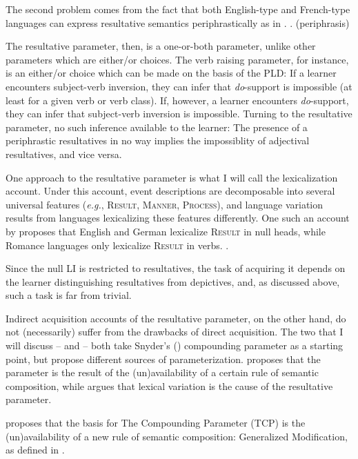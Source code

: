 \documentclass[MilwayThesis]{subfiles}
\begin{document}
The second problem comes from the fact that both English-type and French-type languages can express resultative semantics periphrastically as in \Next.
\ex. (periphrasis)

The resultative parameter, then, is a one-or-both parameter, unlike other parameters which are either/or choices.
The verb raising parameter, for instance, is an either/or choice which can be made on the basis of the PLD:
If a learner encounters subject-verb inversion, they can infer that \textit{do}-support is impossible (at least for a given verb or verb class). 
If, however, a learner encounters \textit{do}-support, they can infer that subject-verb inversion is impossible. 
Turning to the resultative parameter, no such inference available to the learner:
The presence of a periphrastic resultatives in no way implies the impossiblity of adjectival resultatives, and vice versa.

One approach to the resultative parameter is what I will call the lexicalization account.
Under this account, event descriptions are decomposable into several universal features (\textit{e.g.}, \textsc{Result}, \textsc{Manner}, \textsc{Process}), and language variation results from languages lexicalizing these features differently.
One such an account by \textcite{son2008microparameters} proposes that English and German lexicalize \textsc{Result} in null heads, while Romance languages only lexicalize \textsc{Result} in verbs.
\ex.

Since the null LI is restricted to resultatives, the task of acquiring it depends on the learner distinguishing resultatives from depictives, and, as discussed above, such a task is far from trivial.

Indirect acquisition accounts of the resultative parameter, on the other hand, do not (necessarily) suffer from the drawbacks of direct acquisition.
The two that I will discuss -- \textcite{snyder2012parameter} and \textcite{kratzer2004building} -- both take Snyder's (\citeyear{snyder1995language}) compounding parameter as a starting point, but propose different sources of parameterization.
\textcite{snyder2012parameter} proposes that the parameter is the result of the (un)availability of a certain rule of semantic composition, while \textcite{kratzer2004building} argues that lexical variation is the cause of the resultative parameter.

\textcite{snyder2012parameter} proposes that the basis for The Compounding Parameter (TCP) is the (un)availability of a new rule of semantic composition: Generalized Modification, as defined in \Next.
\end{document}
